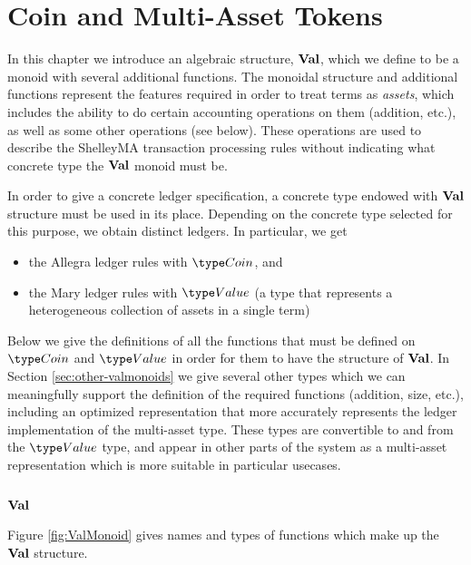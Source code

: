 \section{Coin and Multi-Asset Tokens}
\label{sec:coin-ma}

In this chapter we introduce an algebraic structure, $\mathbf{Val}$,
which we define to be a monoid with several additional functions.
The monoidal structure and additional functions represent the
features required in order to treat terms as \emph{assets},
which includes the ability to do certain accounting operations on them (addition, etc.),
as well as some other operations (see below).
These operations are used to describe the ShelleyMA transaction processing rules
without indicating what concrete type the $\mathbf{Val}$ monoid must be.

In order to give a concrete ledger specification, a concrete type
endowed with $\mathbf{Val}$ structure must be used in its place.
Depending on the concrete type selected for this purpose,
we obtain distinct ledgers. In particular, we get

\begin{itemize}
  \item the Allegra ledger rules with $\Coin$, and
  \item the Mary ledger rules with $\Value$ (a type that represents a heterogeneous collection of assets in a
  single term)
\end{itemize}

Below we give the definitions of all the functions that must be defined on
$\Coin$ and $\Value$ in order for them to have the structure of $\mathbf{Val}$.
In Section \ref{sec:other-valmonoids} we give several other types which we can meaningfully
support the definition of the required functions (addition, size, etc.), including
an optimized representation that more accurately represents the ledger implementation
of the multi-asset type.
These types are convertible to and from the $\Value$ type, and appear in other
parts of the system as a multi-asset representation which is more suitable in particular
usecases.

\subsection{$\mathbf{Val}$}

Figure \ref{fig:ValMonoid} gives names and types of functions which
make up the $\mathbf{Val}$ structure.

